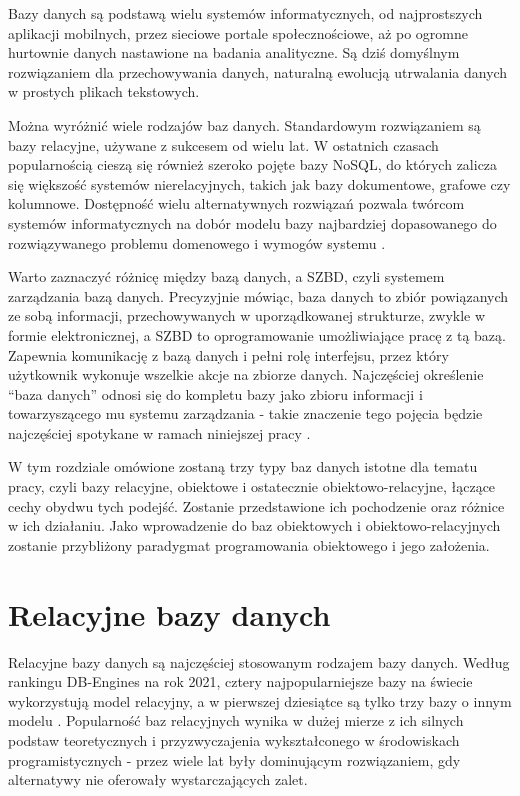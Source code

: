 \documentclass[a4paper,twoside,12pt]{book}
\begin{document}
Bazy danych są podstawą wielu systemów informatycznych, od najprostszych aplikacji mobilnych, przez sieciowe portale społecznościowe, aż po ogromne hurtownie danych nastawione na badania analityczne. Są dziś domyślnym rozwiązaniem dla przechowywania danych, naturalną ewolucją utrwalania danych w prostych plikach tekstowych.

Można wyróżnić wiele rodzajów baz danych. Standardowym rozwiązaniem są bazy relacyjne, używane z sukcesem od wielu lat. W ostatnich czasach popularnością cieszą się również szeroko pojęte bazy NoSQL, do których zalicza się większość systemów nierelacyjnych, takich jak bazy dokumentowe, grafowe czy kolumnowe. Dostępność wielu alternatywnych rozwiązań pozwala twórcom systemów informatycznych na dobór modelu bazy najbardziej dopasowanego do rozwiązywanego problemu domenowego i wymogów systemu \cite{bib:survey-and-comparison-of-rel-and-non-rel-databases}.

Warto zaznaczyć różnicę między bazą danych, a SZBD, czyli systemem zarządzania bazą danych. Precyzyjnie mówiąc, baza danych to zbiór powiązanych ze sobą informacji, przechowywanych w uporządkowanej strukturze, zwykle w formie elektronicznej, a SZBD to oprogramowanie umożliwiające pracę z tą bazą. Zapewnia komunikację z bazą danych i pełni rolę interfejsu, przez który użytkownik wykonuje wszelkie akcje na zbiorze danych. Najczęściej określenie ``baza danych'' odnosi się do kompletu bazy jako zbioru informacji i towarzyszącego mu systemu zarządzania - takie znaczenie tego pojęcia będzie najczęściej spotykane w ramach niniejszej pracy \cite{bib:evolution-odbs}. 

W tym rozdziale omówione zostaną trzy typy baz danych istotne dla tematu pracy, czyli bazy relacyjne, obiektowe i ostatecznie obiektowo-relacyjne, łączące cechy obydwu tych podejść. Zostanie przedstawione ich pochodzenie oraz różnice w ich działaniu. Jako wprowadzenie do baz obiektowych i obiektowo-relacyjnych zostanie przybliżony paradygmat programowania obiektowego i jego założenia.

\section{Relacyjne bazy danych}

Relacyjne bazy danych są najczęściej stosowanym rodzajem bazy danych. Według rankingu DB-Engines na rok 2021, cztery najpopularniejsze bazy na świecie wykorzystują model relacyjny, a w pierwszej dziesiątce są tylko trzy bazy o innym modelu \cite{bib:db-engines-ranking}. Popularność baz relacyjnych wynika w dużej mierze z ich silnych podstaw teoretycznych i przyzwyczajenia wykształconego w środowiskach programistycznych - przez wiele lat były dominującym rozwiązaniem, gdy alternatywy nie oferowały wystarczających zalet.
\end{document}
